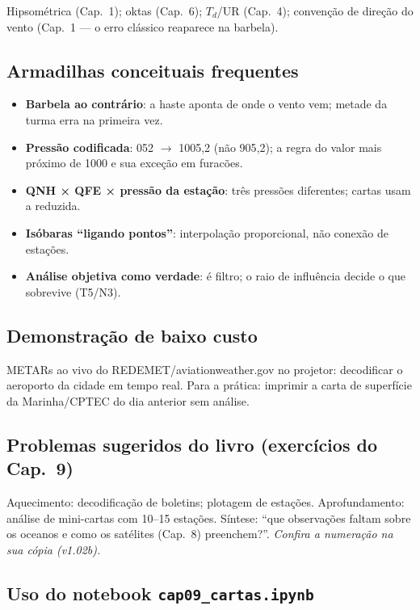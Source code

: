 Hipsométrica (Cap.~1); oktas (Cap.~6); $T_d$/UR (Cap.~4); convenção de
direção do vento (Cap.~1 — o erro clássico reaparece na barbela).

\subsection*{Armadilhas conceituais frequentes}

\begin{itemize}
  \item \textbf{Barbela ao contrário}: a haste aponta de onde o vento vem;
        metade da turma erra na primeira vez.
  \item \textbf{Pressão codificada}: 052 $\to$ 1005{,}2 (não 905{,}2);
        a regra do valor mais próximo de 1000 e sua exceção em furacões.
  \item \textbf{QNH × QFE × pressão da estação}: três pressões diferentes;
        cartas usam a reduzida.
  \item \textbf{Isóbaras ``ligando pontos''}: interpolação proporcional,
        não conexão de estações.
  \item \textbf{Análise objetiva como verdade}: é filtro; o raio de
        influência decide o que sobrevive (T5/N3).
\end{itemize}

\subsection*{Demonstração de baixo custo}

METARs ao vivo do REDEMET/aviationweather.gov no projetor: decodificar o
aeroporto da cidade em tempo real. Para a prática: imprimir a carta de
superfície da Marinha/CPTEC do dia anterior sem análise.

\subsection*{Problemas sugeridos do livro (exercícios do Cap.~9)}

Aquecimento: decodificação de boletins; plotagem de estações.
Aprofundamento: análise de mini-cartas com 10--15 estações. Síntese:
``que observações faltam sobre os oceanos e como os satélites (Cap.~8)
preenchem?''. \emph{Confira a numeração na sua cópia (v1.02b).}

\subsection*{Uso do notebook \texttt{cap09\_cartas.ipynb}}

